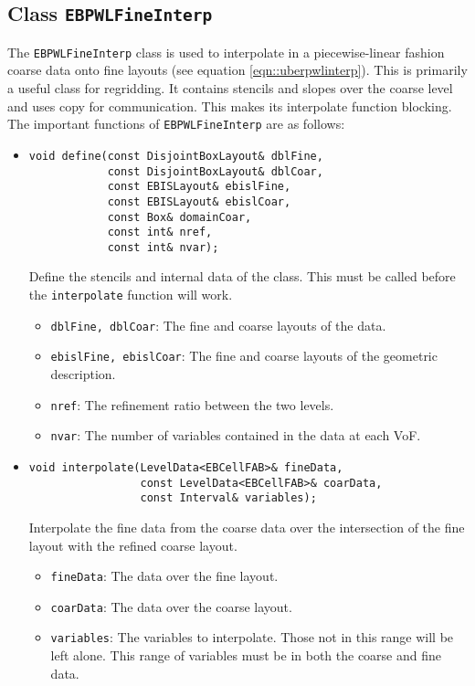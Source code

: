 \subsection{Class {\tt EBPWLFineInterp}}

The {\tt EBPWLFineInterp} class is used to interpolate in a
piecewise-linear fashion coarse data onto fine layouts
(see equation \ref{eqn::uberpwlinterp}). This
is primarily a useful class for regridding.  It
contains stencils and slopes over the coarse level and uses
copy for communication.   This makes its {interpolate} function
blocking.  The important functions of {\tt EBPWLFineInterp} are 
as follows:
\begin{itemize}
\item \begin{small}\begin{verbatim}
void define(const DisjointBoxLayout& dblFine,
            const DisjointBoxLayout& dblCoar,
            const EBISLayout& ebislFine,
            const EBISLayout& ebislCoar,
            const Box& domainCoar,
            const int& nref,
            const int& nvar);        
\end{verbatim}\end{small}
Define the stencils and internal data of the class.  This
must be called before the {\tt interpolate} function will work. 

\begin{itemize}
\item {\tt dblFine, dblCoar}: The fine and coarse layouts
        of the data.
\item {\tt ebislFine, ebislCoar}: The fine and coarse layouts
        of the geometric description.
\item {\tt nref}: The refinement ratio between the two levels.
\item {\tt nvar}: The number of variables contained in the data
        at each VoF.
\end{itemize}

\item \begin{small}\begin{verbatim}
void interpolate(LevelData<EBCellFAB>& fineData,
                 const LevelData<EBCellFAB>& coarData,
                 const Interval& variables);
\end{verbatim}\end{small}
Interpolate the fine data from the coarse data 
over the intersection
of the fine layout with the refined coarse layout. 

\begin{itemize}
\item {\tt fineData}: The data over the fine layout.
\item {\tt coarData}: The data over the coarse layout.
\item {\tt variables}:  The variables to interpolate.  Those not
        in this range will be left alone.   This range of variables
        must be in both the coarse and fine data.
\end{itemize}
\end{itemize}

